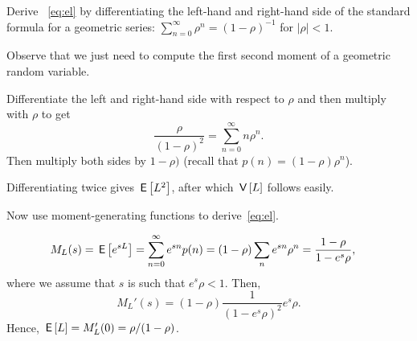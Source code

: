 \begin{exercise} \label{ex:14}
Derive ~\cref{eq:el} by differentiating the left-hand and right-hand side of
 the standard formula for a geometric series:  $\sum_{n=0}^{\infty}\rho^n = (1-\rho)^{-1}$ for $|\rho| < 1$. 
\begin{hint}
   Observe that  we just need to compute the first second moment of a geometric random variable.
\end{hint}
\begin{solution}
Differentiate the left and right-hand side with respect to
$\rho$  and then  multiply with $\rho$ to get
\begin{equation*}
\dfrac{\rho}{(1-\rho)^2}=\sum_{n=0}^{\infty}n\rho^n.
\end{equation*}
Then multiply both sides by $1-\rho)$ (recall that $p(n) = (1-\rho)\rho^n$).

Differentiating twice gives $\,\mathsf{E}\left[L^2\right]$, after which $\,\mathsf{V}\left[L\right]$ follows easily.
\end{solution}
\end{exercise}

\begin{extra}\label{ex:34}
  Now use moment-generating  functions to derive~\cref{eq:el}. 
\begin{solution}
\begin{equation*}
  \begin{split}
  M_L(s) 
&= \,\mathsf{E}\left[e^{s L}\right] = \sum_{n=0}^\infty e^{s n}p(n) = (1-\rho) \sum_n e^{s n} \rho^n=\frac{1-\rho}{1-e^{s}\rho},
  \end{split}
\end{equation*}
where we assume that $s$ is such that $e^s \rho < 1$. Then, 
\begin{equation*}
  M_L'(s) = (1-\rho) \frac{1}{(1-e^s\rho)^2} e^s \rho.
\end{equation*}
Hence, $\,\mathsf{E}\left[L\right] = M_L'(0) = \rho/(1-\rho)$.
\end{solution}
\end{extra}



